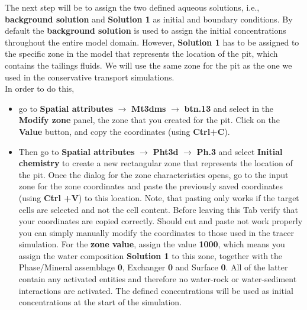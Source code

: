 The next step will be to assign the two defined aqueous solutions, 
i.e., {\color{blue}\textbf{background solution}} 
and {\color{blue}\textbf{Solution 1}}
as initial and boundary conditions. 
By default the {\color{blue}\textbf{background solution}} is used to
assign the initial concentrations throughout the entire model domain.
However, {\color{blue}\textbf{Solution 1}} has to be assigned 
to the specific zone in the model that represents 
the location of the pit, which contains 
the tailings fluids. 
We will use the same zone for the pit as the one we used in 
the conservative transport simulations. 
\\
In order to do this, 
\begin{itemize}
\item go to 
{\color{blue}\textbf{Spatial attributes}} 
$\rightarrow$ {\color{blue}\textbf{Mt3dms}}
$\rightarrow$ {\color{blue}\textbf{btn.13}} 
and select in the 
{\color{blue}\textbf{Modify zone}} panel, 
the zone that you created for the pit. 
Click on the {\color{blue}\textbf{Value}} button, 
and copy the coordinates 
(using {\color{blue}\textbf{Ctrl+C}}). 
\item Then go to 
{\color{blue}\textbf{Spatial attributes}} 
$\rightarrow$ {\color{blue}\textbf{Pht3d}}
$\rightarrow$ {\color{blue}\textbf{Ph.3}}
and select {\color{blue}\textbf{Initial chemistry}} 
to create a new rectangular zone that represents
the location of the pit. 
Once the dialog for the zone characteristics opens, 
go to the input zone for the zone coordinates 
and paste the previously saved 
coordinates (using {\color{blue}\textbf{Ctrl +V}}) 
to this location. 
Note, that pasting only works if the target cells are 
selected and not the cell content. Before leaving this Tab 
verify that your coordinates are copied correctly. 
Should cut and paste not work properly you can simply manually
modify the coordinates to those used in the tracer simulation. 
For the {\color{blue}\textbf{zone value}}, 
assign the value {\color{blue}\textbf{1000}}, 
which means you assign the water composition
{\color{blue}\textbf{Solution 1}} to this zone, together with
the Phase/Mineral assemblage {\color{blue}\textbf{0}}, 
Exchanger {\color{blue}\textbf{0}}
and Surface {\color{blue}\textbf{0}}. 
All of the latter contain any activated 
entities and therefore no water-rock or water-sediment interactions 
are activated.   
The defined concentrations will be used as initial concentrations 
at the start of the simulation.
\end{itemize}

